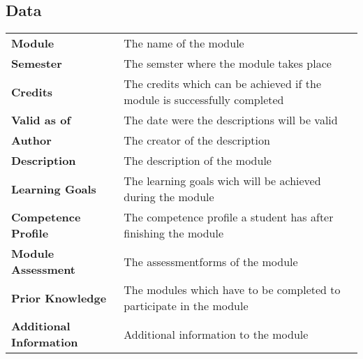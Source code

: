     \subsection{Data}
    \begin{table}[H]
        \begin{tabular}{ll}
            \textbf{Module} & The name of the module \\
            \textbf{Semester} & The semster where the module takes place \\ 
            \textbf{Credits} & The credits which can be achieved if the module is successfully completed \\
            \textbf{Valid as of} & The date were the descriptions will be valid \\
            \textbf{Author} & The creator of the description \\
            \textbf{Description} & The description of the module \\
            \textbf{Learning Goals} & The learning goals wich will be achieved during the module \\
            \textbf{Competence Profile} & The competence profile a student has after finishing the module \\
            \textbf{Module Assessment} & The assessmentforms of the module \\
            \textbf{Prior Knowledge} & The modules which have to be completed to participate in the module \\
            \textbf{Additional Information} & Additional information to the module
        \end{tabular}
    \end{table}
